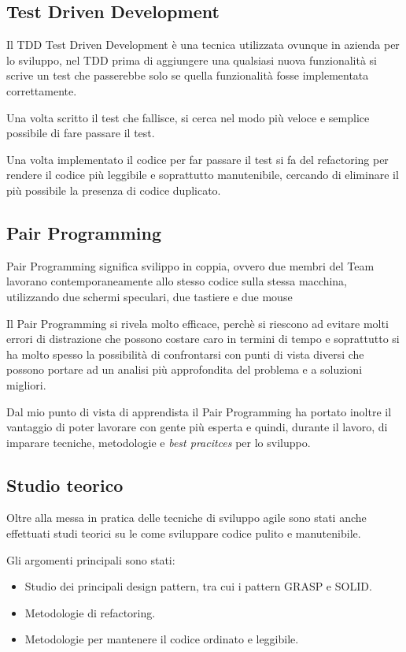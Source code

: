 \subsection{Test Driven Development}
Il TDD Test Driven Development è una tecnica utilizzata ovunque in azienda per lo sviluppo, nel TDD
prima di aggiungere una qualsiasi nuova funzionalità si scrive un test che passerebbe solo se 
quella funzionalità fosse implementata correttamente. 

Una volta scritto il test che fallisce, si cerca nel modo più veloce e semplice possibile di fare passare il test.

Una volta implementato il codice per far passare il test si fa del refactoring per rendere il codice più leggibile
e soprattutto manutenibile, cercando di eliminare il più possibile la presenza di codice duplicato.

\subsection{Pair Programming}
Pair Programming significa svilippo in coppia, ovvero due membri del Team lavorano contemporaneamente
allo stesso codice sulla stessa macchina, utilizzando due schermi speculari, due tastiere e due mouse

Il Pair Programming si rivela molto efficace, perchè si riescono ad evitare molti
errori di distrazione che possono costare caro in termini di tempo e soprattutto
si ha molto spesso la possibilità di confrontarsi con punti di vista diversi che possono
portare ad un analisi più approfondita del problema e a soluzioni migliori. 

Dal mio punto di vista di apprendista il Pair Programming ha portato inoltre il vantaggio
di poter lavorare con gente più esperta e quindi, durante il lavoro, di imparare tecniche,
metodologie e \emph{best pracitces} per lo sviluppo.

\subsection{Studio teorico}
Oltre alla messa in pratica delle tecniche di sviluppo agile sono stati anche effettuati studi teorici
su le come sviluppare codice pulito e manutenibile.

Gli argomenti principali sono stati:
\begin{itemize}
\item Studio dei principali design pattern, tra cui i pattern GRASP e SOLID.
\item Metodologie di refactoring.
\item Metodologie per mantenere il codice ordinato e leggibile.
\end{itemize}
